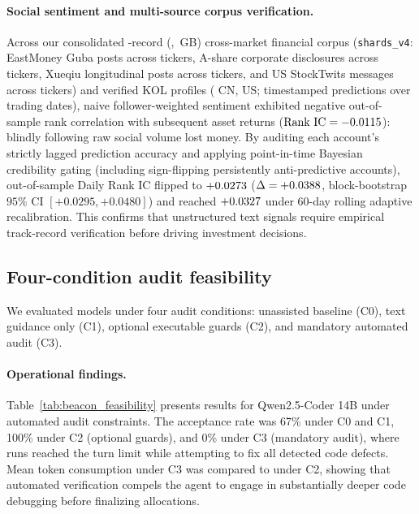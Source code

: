 \paragraph{Social sentiment and multi-source corpus verification.}
Across our consolidated \CorpusTotalRecords{}-record (\CorpusTotalShort{}, \CorpusTotalSizeGB{}\,GB)
cross-market financial corpus (\texttt{shards\_v4}: \CorpusGubaRecords{} EastMoney Guba posts across
\CorpusGubaTickers{} tickers, \CorpusAnnounceRecords{} A-share corporate disclosures across
\CorpusAnnounceTickers{} tickers, \CorpusXueqiuRecords{} Xueqiu longitudinal posts across
\CorpusXueqiuTickers{} tickers, and \CorpusStockTwitsRecords{} US StockTwits messages across
\CorpusStockTwitsTickers{} tickers) and \KOLTotalAccounts{} verified KOL profiles (\KOLCNCount{} CN,
\KOLUSCount{} US; \KOLPredRows{} timestamped predictions over \KOLTradingDates{} trading dates),
naive follower-weighted sentiment exhibited negative out-of-sample rank correlation with subsequent
asset returns ($\text{Rank IC} = -0.0115{}$): blindly following raw social volume lost money.
By auditing each account's strictly lagged prediction accuracy and applying point-in-time Bayesian
credibility gating (including sign-flipping persistently anti-predictive accounts), out-of-sample
Daily Rank IC flipped to $+0.0273{}$ ($\Delta = +0.0388{}$, block-bootstrap $95\%$ CI
$[+0.0295, +0.0480]$) and reached $+0.0327{}$ under 60-day rolling adaptive recalibration.
This confirms that unstructured text signals require empirical track-record verification before
driving investment decisions.

\subsection{Four-condition audit feasibility}
We evaluated models under four audit conditions: unassisted baseline (C0), text guidance
only (C1), optional executable guards (C2), and mandatory automated audit (C3).

\paragraph{Operational findings.}
Table~\ref{tab:beacon_feasibility} presents results for Qwen2.5-Coder 14B under automated audit
constraints. The acceptance rate was 67\% under C0 and C1, 100\% under C2 (optional guards),
and 0\% under C3 (mandatory audit), where runs reached the turn limit while attempting to fix
all detected code defects. Mean token consumption under C3 was \BeaconFourteenCThreeMeanTokens{}
compared to \BeaconFourteenCTwoMeanTokens{} under C2, showing that automated verification
compels the agent to engage in substantially deeper code debugging before finalizing allocations.

